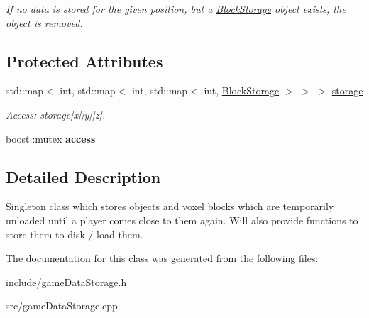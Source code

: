 \begin{DoxyCompactItemize}
\begin{DoxyCompactList}\small\item\em \-If no data is stored for the given position, but a \hyperlink{structBlockStorage}{\-Block\-Storage} object exists, the object is removed. \end{DoxyCompactList}\end{DoxyCompactItemize}
\subsection*{\-Protected \-Attributes}
\begin{DoxyCompactItemize}
\item 
\hypertarget{classGameDataStorage_afb23758539288ab7f65fa8bbd7432b3d}{
std\-::map$<$ int, std\-::map$<$ int, \*
std\-::map$<$ int, \hyperlink{structBlockStorage}{\-Block\-Storage} $>$ $>$ $>$ \hyperlink{classGameDataStorage_afb23758539288ab7f65fa8bbd7432b3d}{storage}}
\label{dc/d0b/classGameDataStorage_afb23758539288ab7f65fa8bbd7432b3d}

\begin{DoxyCompactList}\small\item\em \-Access\-: storage\mbox{[}x\mbox{]}\mbox{[}y\mbox{]}\mbox{[}z\mbox{]}. \end{DoxyCompactList}\item 
\hypertarget{classGameDataStorage_af3a31725626ce217415c029599e4a683}{
boost\-::mutex {\bfseries access}}
\label{dc/d0b/classGameDataStorage_af3a31725626ce217415c029599e4a683}

\end{DoxyCompactItemize}


\subsection{\-Detailed \-Description}
\-Singleton class which stores objects and voxel blocks which are temporarily unloaded until a player comes close to them again. \-Will also provide functions to store them to disk / load them. 

\-The documentation for this class was generated from the following files\-:\begin{DoxyCompactItemize}
\item 
include/game\-Data\-Storage.\-h\item 
src/game\-Data\-Storage.\-cpp\end{DoxyCompactItemize}
